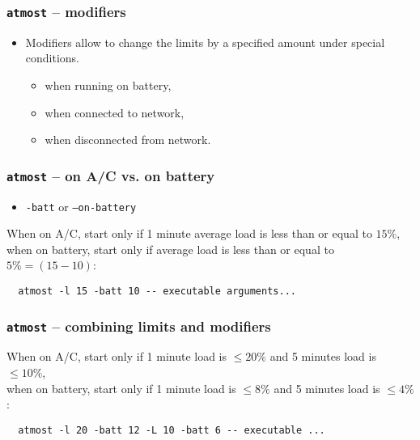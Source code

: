 \documentclass[compress,table,xcolor=table]{beamer}
\newcommand{\shelltext}[1]{\texttt{\colorbox{light-gray}{#1}}}
\begin{document}
\begin{frame}[fragile]
  \frametitle{\shelltext{atmost} -- modifiers}
  \begin{itemize}
    \Large
    \item Modifiers allow to change the limits by a specified amount under
      special conditions.
    \begin{itemize}
      \large
      \item when running on battery,
      \item when connected to  network,
      \item when disconnected from network.
    \end{itemize}
  \end{itemize}
\end{frame}
\begin{frame}[fragile]
  \frametitle{\shelltext{atmost} -- on A/C vs. on battery}
  \begin{itemize}
    \item \shelltext{-batt} or \shelltext{--on-battery}
  \end{itemize}

  \large
  When on A/C, start only if 1 minute average load is less than or equal to $15\%$,\\
  when on battery, start only if average load is less than or equal to $5\% = (15-10)$:
  \normalsize
  \begin{lstlisting}
  atmost -l 15 -batt 10 -- executable arguments...
  \end{lstlisting}

\end{frame}
\begin{frame}[fragile]
  \frametitle{\shelltext{atmost} -- combining limits and modifiers}

  \large
  When on A/C, start only if 1 minute load is $\leq 20\%$ and
  5 minutes load is $\leq 10\%$,\\
  when on battery, start only if 1 minute load is $\leq 8\%$ and
  5 minutes load is $\leq 4\%$:
  \normalsize
  \begin{lstlisting}
  atmost -l 20 -batt 12 -L 10 -batt 6 -- executable ...
  \end{lstlisting}

\end{frame}
\end{document}
